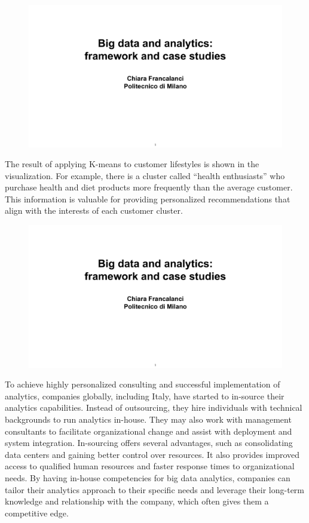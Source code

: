 \begin{figure}[!h]
  \centering
  \includegraphics[page=73, trim = 1cm 1.5cm 2.5cm 3cm, clip, width=\imagewidth]{images/06 - BIG_DATA.pdf}
\end{figure}

The result of applying K-means to customer lifestyles is shown in the
visualization. For example, there is a cluster called ``health
enthusiasts'' who purchase health and diet products more frequently than
the average customer. This information is valuable for providing
personalized recommendations that align with the interests of each
customer cluster.

\begin{figure}[!h]
  \centering
  \includegraphics[page=74, trim = 1cm 1.5cm 1.5cm 1cm, clip, width=\imagewidth]{images/06 - BIG_DATA.pdf}
\end{figure}

To achieve highly personalized consulting and successful implementation
of analytics, companies globally, including Italy, have started to
in-source their analytics capabilities. Instead of outsourcing, they
hire individuals with technical backgrounds to run analytics in-house.
They may also work with management consultants to facilitate
organizational change and assist with deployment and system integration.
In-sourcing offers several advantages, such as consolidating data
centers and gaining better control over resources. It also provides
improved access to qualified human resources and faster response times
to organizational needs. By having in-house competencies for big data
analytics, companies can tailor their analytics approach to their
specific needs and leverage their long-term knowledge and relationship
with the company, which often gives them a competitive edge.

